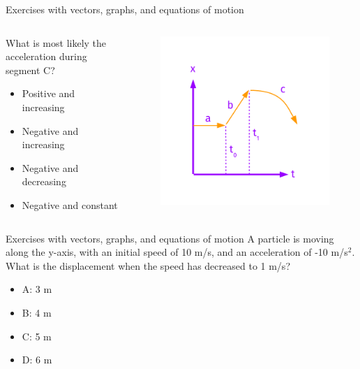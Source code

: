 \documentclass{beamer}
\begin{document}
\begin{frame}{Exercises with vectors, graphs, and equations of motion}
\begin{columns}[T]
\begin{column}{0.4\textwidth}
\small
What is most likely the acceleration during segment C?
\begin{itemize}
\item Positive and increasing
\item Negative and increasing
\item Negative and decreasing
\item Negative and constant
\end{itemize}
\end{column}
\begin{column}{0.6\textwidth}
\begin{figure}
\centering
\includegraphics[width=\textwidth,trim=0cm 0cm 0cm 1.5cm,clip=true]{figures/FurtherExercises.pdf}
\end{figure}
\end{column}
\end{columns}
\end{frame}

\begin{frame}{Exercises with vectors, graphs, and equations of motion}
A particle is moving along the y-axis, with an initial speed of 10 m/s, and an acceleration of -10 m/s$^2$.  What is the displacement when the speed has decreased to 1 m/s?\\
\begin{itemize}
\item A: 3 m
\item B: 4 m
\item C: 5 m
\item D: 6 m
\end{itemize}
\end{frame}
\end{document}
